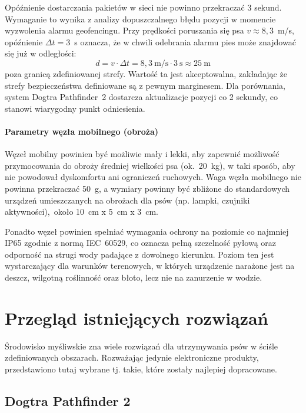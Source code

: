  Opóźnienie dostarczania pakietów w sieci nie powinno przekraczać 3 sekund.
Wymaganie to wynika z analizy dopuszczalnego błędu pozycji w momencie wyzwolenia alarmu
geofencingu. Przy prędkości poruszania się psa $v \approx 8{,}3$~m/s, opóźnienie
$\Delta t = 3$~s oznacza, że w chwili odebrania alarmu pies może znajdować się już
w odległości:
\begin{equation}
d = v \cdot \Delta t = 8{,}3~\text{m/s} \cdot 3~\text{s} \approx 25~\text{m}
\end{equation}
poza granicą zdefiniowanej strefy. Wartość ta jest akceptowalna, zakładając że strefy
bezpieczeństwa definiowane są z pewnym marginesem. Dla porównania, system Dogtra
Pathfinder~2 dostarcza aktualizacje pozycji co 2 sekundy, co stanowi wiarygodny punkt odniesienia.


\paragraph{Parametry węzła mobilnego (obroża)}

Węzeł mobilny powinien być możliwie mały i lekki, aby zapewnić możliwość przymocowania
do obroży średniej wielkości psa (ok.\ 20~kg), w taki sposób, aby nie powodował dyskomfortu ani ograniczeń ruchowych.
Waga węzła mobilnego nie powinna przekraczać 50~g, a wymiary powinny być zbliżone do 
standardowych urządzeń umieszczanych na obrożach dla psów (np. lampki, czujniki aktywności),\ około 10~cm x 5~cm x 3~cm.

Ponadto węzeł powinien spełniać wymagania ochrony na poziomie co najmniej IP65
zgodnie z normą IEC~60529, co oznacza pełną szczelność pyłową oraz odporność
na strugi wody padające z dowolnego kierunku. Poziom ten jest wystarczający
dla warunków terenowych, w których urządzenie narażone jest na deszcz,
wilgotną roślinność oraz błoto, lecz nie na zanurzenie w wodzie.



\newpage
\section{Przegląd istniejących rozwiązań}
\label{sec:przeglad-istniejacych-rozwiazan}

Środowisko myśliwskie zna wiele rozwiązań dla utrzymywania psów w ściśle zdefiniowanych obszarach.
Rozważając jedynie elektroniczne produkty, przedstawiono tutaj wybrane tj. takie, które zostały najlepiej dopracowane.

\subsection*{Dogtra Pathfinder 2}

